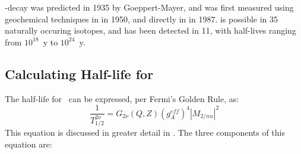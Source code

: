 \documentclass[/main.tex]{subfiles}
\begin{document}
\bb -decay was predicted in 1935 by Goeppert-Mayer\cite{GoeppertMayer1935}, and was first measured using geochemical techniques in  in 1950\cite{Inghram1950}, and directly in  in 1987\cite{Elliott1987}.
\tnbb is possible in 35 naturally occuring isotopes, and has been detected in 11, with half-lives ranging from $10^{18}$~y to $10^{24}$~y\cite{Saakyan2013}.

\subsection{Calculating Half-life for \tnbb}
The half-life for \tnbb\ can be expressed, per Fermi's Golden Rule, as:
\begin{equation} \label{eq:2nvvHL}
  \frac{1}{T^{2\nu}_{1/2}}=G_{2\nu}(Q,Z)(g^{eff}_A)^4|M_{2/nu}|^2
\end{equation}
This equation is discussed in greater detail in \cite{Saakyan2013, Engel2017}.
The three components of this equation are:
\end{document}
